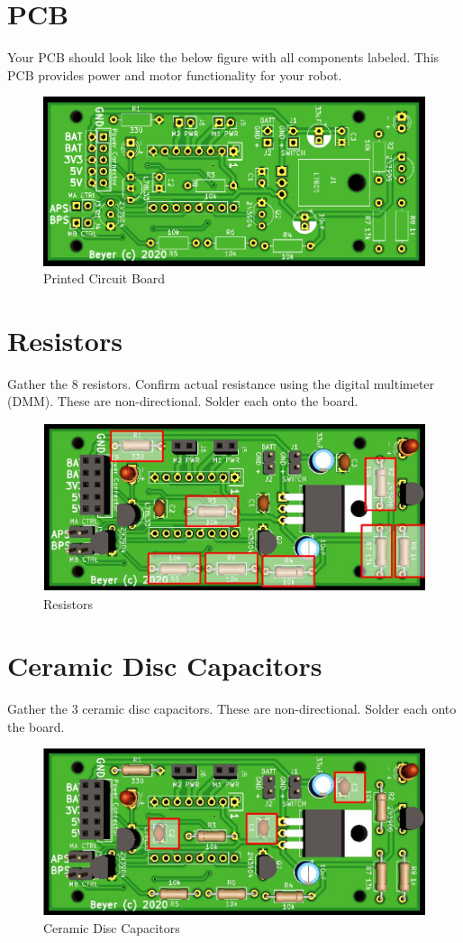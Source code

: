 \documentclass{handout}
\begin{document}
\newpage
\clearpage
\pagebreak
	
	\section{PCB}
	Your PCB should look like the below figure with all components labeled. This PCB provides power and motor functionality for your robot.
		\begin{figure} [H]
			\centering
			\includegraphics[width=.75\textwidth]{robot.png}
			\caption{Printed Circuit Board}
		\end{figure}
	
	
	\section{Resistors}
	Gather the 8 resistors. Confirm actual resistance using the digital multimeter (DMM). These are non-directional. Solder each onto the board.
	
	\begin{figure} [H]
		\centering
		\includegraphics[width=.5\textwidth]{resistors.jpg}
		\caption{Resistors}
	\end{figure}
	
	\section{Ceramic Disc Capacitors}
	Gather the 3 ceramic disc capacitors. These are non-directional. Solder each onto the board.
	
	\begin{figure} [H]
		\centering
		\includegraphics[width=.5\textwidth]{disccapacitors.jpg}
		\caption{Ceramic Disc Capacitors}
	\end{figure}
	
\end{document}
